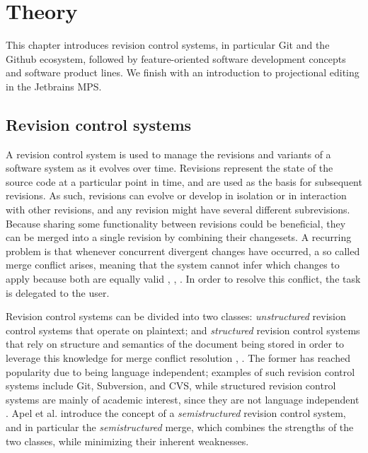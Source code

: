 \chapter{Theory}

This chapter introduces revision control systems, in particular Git and the Github ecosystem, followed by feature-oriented software development concepts and software product lines. We finish with an introduction to projectional editing in the Jetbrains MPS.

\section{Revision control systems}
A revision control system is used to manage the revisions and variants of a software system as it evolves over time. Revisions represent the state of the source code at a particular point in time, and are used as the basis for subsequent revisions. As such, revisions can evolve or develop in isolation or in interaction with other revisions, and any revision might have several different subrevisions. Because sharing some functionality between revisions could be beneficial, they can be merged into a single revision by combining their changesets. A recurring problem is that whenever concurrent divergent changes have occurred, a so called merge conflict arises, meaning that the system cannot infer which changes to apply because both are equally valid \cite{mens2002}, \cite{apel2011}, \cite{buckley2005}. In order to resolve this conflict, the task is delegated to the user.

Revision control systems can be divided into two classes: \textit{unstructured} revision control systems that operate on plaintext; and \textit{structured} revision control systems that rely on structure and semantics of the document being stored in order to leverage this knowledge for merge conflict resolution \cite{mens2002}, \cite{apel2011}. The former has reached popularity due to being language independent; examples of such revision control systems include Git, Subversion, and CVS, while structured revision control systems are mainly of academic interest, since they are not language independent \cite{apel2011}. Apel et al. \cite{apel2011} introduce the concept of a \textit{semistructured} revision control system, and in particular the \textit{semistructured} merge, which combines the strengths of the two classes, while minimizing their inherent weaknesses.

